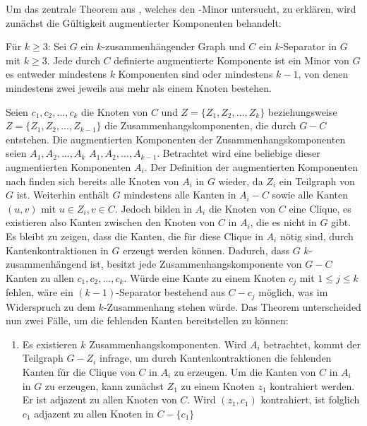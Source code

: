 Um das zentrale Theorem aus \cite{KeM92}, welches den \kdd-Minor untersucht, zu erklären, wird zunächst die Gültigkeit augmentierter Komponenten behandelt:
\begin{theorem}\label{eq:Theorem33}
  Für $k \geq 3$: Sei $G$ ein $k$-zusammenhängender Graph und $C$ ein $k$-Separator in $G$ mit $k \geq 3$.
  Jede durch $C$ definierte augmentierte Komponente ist ein Minor von $G$ \gdw es entweder mindestens $k$ Komponenten sind oder mindestens $k-1$, von denen mindestens zwei jeweils aus mehr als einem Knoten bestehen.
\end{theorem}
\begin{beweis}
  Seien $c_1, c_2, ..., c_k$ die Knoten von $C$ und $Z = \{Z_1, Z_2, ..., Z_k\}$ beziehungsweise $Z = \{Z_1, Z_2, ..., Z_{k-1}\}$ die Zusammenhangskomponenten, die durch $G - C$ entstehen.
  Die augmentierten Komponenten der Zusammenhangskomponenten seien $A_1, A_2, ..., A_k$ \bzw $A_1, A_2, ..., A_{k-1}$.
  Betrachtet wird eine beliebige dieser augmentierten Komponenten $A_i$.
  Der Definition der augmentierten Komponenten nach finden sich bereits alle Knoten von $A_i$ in $G$ wieder, da $Z_i$ ein Teilgraph von $G$ ist.
  Weiterhin enthält $G$ mindestens alle Kanten in $A_i - C$ sowie alle Kanten $(u, v)$ mit $u \in Z_i, v \in C$.
  Jedoch bilden in $A_i$ die Knoten von $C$ eine Clique, es existieren also \ggf Kanten zwischen den Knoten von $C$ in $A_i$, die es nicht in $G$ gibt.
  Es bleibt zu zeigen, dass die Kanten, die für diese Clique in $A_i$ nötig sind, durch Kantenkontraktionen in $G$ erzeugt werden können.
  Dadurch, dass $G$ $k$-zusammenhängend ist, besitzt jede Zusammenhangskomponente von $G - C$ Kanten zu allen $c_1, c_2, ..., c_k$.
  Würde eine Kante zu einem Knoten $c_j$ mit $1 \leq j \leq k$ fehlen, wäre ein $(k-1)$-Separator bestehend aus $C - c_j$ möglich, was im Widerspruch zu dem $k$-Zusammenhang stehen würde.
  Das Theorem unterscheided nun zwei Fälle, um die fehlenden Kanten bereitstellen zu können:
  \begin{enumerate}
    \item Es existieren $k$ Zusammenhangskomponenten.
          Wird $A_i$ betrachtet, kommt der Teilgraph $G - Z_i$ infrage, um durch Kantenkontraktionen die fehlenden Kanten für die Clique von $C$ in $A_i$ zu erzeugen.
          Um die Kanten von $C$ in $A_i$ in $G$ zu erzeugen, kann zunächst $Z_1$ zu einem Knoten $z_1$ kontrahiert werden.
          Er ist adjazent zu allen Knoten von $C$.
          Wird $(z_1, c_1)$ kontrahiert, ist folglich $c_1$ adjazent zu allen Knoten in $C - \{c_1\}$

\end{enumerate}
\end{beweis}
